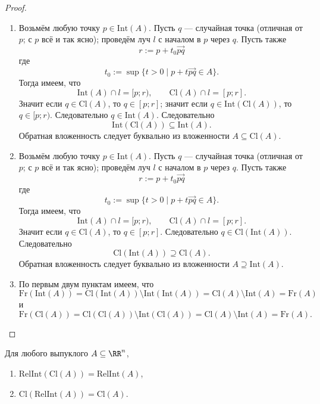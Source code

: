 \documentclass[12pt,a4paper]{article}
\newcommand{\Int}{\ensuremath{\mathrm{Int}}\xspace}
\newcommand{\Cl}{\ensuremath{\mathrm{Cl}}\xspace}
\newcommand{\Fr}{\ensuremath{\mathrm{Fr}}\xspace}
\newcommand{\RelInt}{\ensuremath{\mathrm{RelInt}}\xspace}
\begin{document}
    \begin{proof}
        \begin{enumerate}
            \item Возьмём любую точку $p \in \Int(A)$. Пусть $q$ --- случайная точка (отличная от $p$; с $p$ всё и так ясно); проведём луч $l$ с началом в $p$ через $q$. Пусть также
                \[r := p + t_0 \overrightarrow{pq}\]
                где
                \[t_0 := \sup \{t > 0 \mid p + t \overrightarrow{pq} \in A\}.\]
                Тогда имеем, что
                \[\Int(A) \cap l = [p;r), \qquad \Cl(A) \cap l = [p;r].\]
                Значит если $q \in \Cl(A)$, то $q \in [p; r]$; значит если $q \in \Int(\Cl(A))$, то $q \in [p; r)$. Следовательно $q \in \Int(A)$. Следовательно
                \[\Int(\Cl(A)) \subseteq \Int(A).\]
                Обратная вложенность следует буквально из вложенности $A \subseteq \Cl(A)$.
            \item Возьмём любую точку $p \in \Int(A)$. Пусть $q$ --- случайная точка (отличная от $p$; с $p$ всё и так ясно); проведём луч $l$ с началом в $p$ через $q$. Пусть также
                \[r := p + t_0 \overrightarrow{pq}\]
                где
                \[t_0 := \sup \{t > 0 \mid p + t \overrightarrow{pq} \in A\}.\]
                Тогда имеем, что
                \[\Int(A) \cap l = [p;r), \qquad \Cl(A) \cap l = [p;r].\]
                Значит если $q \in \Cl(A)$, то $q \in [p; r]$. Следовательно $q \in \Cl(\Int(A))$. Следовательно
                \[\Cl(\Int(A)) \supseteq \Cl(A).\]
                Обратная вложенность следует буквально из вложенности $A \supseteq \Int(A)$.
            \item По первым двум пунктам имеем, что
                \[\Fr(\Int(A)) = \Cl(\Int(A)) \setminus \Int(\Int(A)) = \Cl(A) \setminus \Int(A) = \Fr(A)\]
                и
                \[\Fr(\Cl(A)) = \Cl(\Cl(A)) \setminus \Int(\Cl(A)) = \Cl(A) \setminus \Int(A) = \Fr(A).\]
        \end{enumerate}
    \end{proof}

    \begin{corollary}
        Для любого выпуклого $A \subseteq \RR^n$,
        \begin{enumerate}
            \item $\RelInt(\Cl(A)) = \RelInt(A)$,
            \item $\Cl(\RelInt(A)) = \Cl(A)$.
        \end{enumerate}
    \end{corollary}
\end{document}
